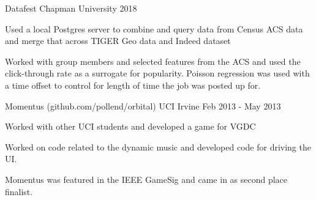 \begin{cventries}
    {Datafest}
    {Chapman University}
    {2018}
    {
    \begin{cvitems} %
        \item {Used a local Postgres server to combine and query data from Census ACS data and merge that across TIGER Geo data and Indeed dataset}
        \item{Worked with group members and selected features from the ACS and used the click-through rate as a surrogate for popularity. Poisson regression was used with a time offset to control for length of time the job was posted up for.}
      \end{cvitems}
    }
    
    {Momentus ({\tiny github.com/pollend/orbital})} %
    {UCI Irvine} %
    {Feb 2013 - May 2013} %
    {
      \begin{cvitems} %
        \item{Worked with other UCI students and developed a game for VGDC}
        \item{Worked on code related to the dynamic music and developed code for driving the UI.}
        \item{Momentus was featured in the IEEE GameSig and came in as second place finalist.}
      \end{cvitems}
    }
\end{cventries}

